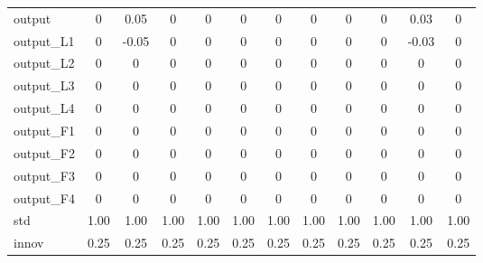 \begin{scriptsize}
\begin{tabular}{l|ccccccccc|cc}
\hline 
output & 0 & 0.05 & 0 & 0 & 0 & 0 & 0 & 0 & 0 & 0.03 & 0 \\ 
output\_L1 & 0 & -0.05 & 0 & 0 & 0 & 0 & 0 & 0 & 0 & -0.03 & 0 \\ 
output\_L2 & 0 & 0 & 0 & 0 & 0 & 0 & 0 & 0 & 0 & 0 & 0 \\ 
output\_L3 & 0 & 0 & 0 & 0 & 0 & 0 & 0 & 0 & 0 & 0 & 0 \\ 
output\_L4 & 0 & 0 & 0 & 0 & 0 & 0 & 0 & 0 & 0 & 0 & 0 \\ 
output\_F1 & 0 & 0 & 0 & 0 & 0 & 0 & 0 & 0 & 0 & 0 & 0 \\ 
output\_F2 & 0 & 0 & 0 & 0 & 0 & 0 & 0 & 0 & 0 & 0 & 0 \\ 
output\_F3 & 0 & 0 & 0 & 0 & 0 & 0 & 0 & 0 & 0 & 0 & 0 \\ 
output\_F4 & 0 & 0 & 0 & 0 & 0 & 0 & 0 & 0 & 0 & 0 & 0 \\ 
\hline 
std & 1.00 & 1.00 & 1.00 & 1.00 & 1.00 & 1.00 & 1.00 & 1.00 & 1.00 & 1.00 & 1.00 \\ 
innov & 0.25 & 0.25 & 0.25 & 0.25 & 0.25 & 0.25 & 0.25 & 0.25 & 0.25 & 0.25 & 0.25 \\ 
\hline 
\end{tabular}\end{scriptsize}